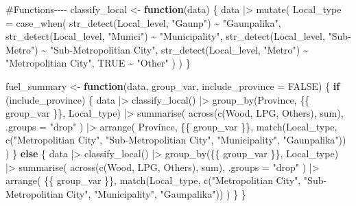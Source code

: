 \documentclass[
  letterpaper,
  DIV=11,
  numbers=noendperiod]{scrartcl}
\newenvironment{Shaded}{\begin{snugshade}}{\end{snugshade}}
\newcommand{\AttributeTok}[1]{\textcolor[rgb]{0.40,0.45,0.13}{#1}}
\newcommand{\CommentTok}[1]{\textcolor[rgb]{0.37,0.37,0.37}{#1}}
\newcommand{\ConstantTok}[1]{\textcolor[rgb]{0.56,0.35,0.01}{#1}}
\newcommand{\ControlFlowTok}[1]{\textcolor[rgb]{0.00,0.23,0.31}{\textbf{#1}}}
\newcommand{\FunctionTok}[1]{\textcolor[rgb]{0.28,0.35,0.67}{#1}}
\newcommand{\NormalTok}[1]{\textcolor[rgb]{0.00,0.23,0.31}{#1}}
\newcommand{\OtherTok}[1]{\textcolor[rgb]{0.00,0.23,0.31}{#1}}
\newcommand{\SpecialCharTok}[1]{\textcolor[rgb]{0.37,0.37,0.37}{#1}}
\newcommand{\StringTok}[1]{\textcolor[rgb]{0.13,0.47,0.30}{#1}}
\begin{document}
\begin{Shaded}
\begin{Highlighting}[]
\CommentTok{\#Functions{-}{-}{-}{-}}
\NormalTok{classify\_local }\OtherTok{\textless{}{-}} \ControlFlowTok{function}\NormalTok{(data) \{}
\NormalTok{  data }\SpecialCharTok{|\textgreater{}}
    \FunctionTok{mutate}\NormalTok{(}
      \AttributeTok{Local\_type =} \FunctionTok{case\_when}\NormalTok{(}
        \FunctionTok{str\_detect}\NormalTok{(Local\_level, }\StringTok{"Gaunp"}\NormalTok{) }\SpecialCharTok{\textasciitilde{}} \StringTok{"Gaunpalika"}\NormalTok{,}
        \FunctionTok{str\_detect}\NormalTok{(Local\_level, }\StringTok{"Munici"}\NormalTok{) }\SpecialCharTok{\textasciitilde{}} \StringTok{"Municipality"}\NormalTok{,}
        \FunctionTok{str\_detect}\NormalTok{(Local\_level, }\StringTok{"Sub{-}Metro"}\NormalTok{) }\SpecialCharTok{\textasciitilde{}} \StringTok{"Sub{-}Metropolitian City"}\NormalTok{,}
        \FunctionTok{str\_detect}\NormalTok{(Local\_level, }\StringTok{"Metro"}\NormalTok{) }\SpecialCharTok{\textasciitilde{}} \StringTok{"Metropolitian City"}\NormalTok{,}
        \ConstantTok{TRUE} \SpecialCharTok{\textasciitilde{}} \StringTok{"Other"}
\NormalTok{      )}
\NormalTok{    )}
\NormalTok{\}}

\NormalTok{fuel\_summary }\OtherTok{\textless{}{-}} \ControlFlowTok{function}\NormalTok{(data, group\_var, }\AttributeTok{include\_province =} \ConstantTok{FALSE}\NormalTok{) \{}
  \ControlFlowTok{if}\NormalTok{ (include\_province) \{}
\NormalTok{    data }\SpecialCharTok{|\textgreater{}}
      \FunctionTok{classify\_local}\NormalTok{() }\SpecialCharTok{|\textgreater{}}
      \FunctionTok{group\_by}\NormalTok{(Province, \{\{ group\_var \}\}, Local\_type) }\SpecialCharTok{|\textgreater{}}
      \FunctionTok{summarise}\NormalTok{(}
        \FunctionTok{across}\NormalTok{(}\FunctionTok{c}\NormalTok{(Wood, LPG, Others), sum),}
        \AttributeTok{.groups =} \StringTok{"drop"}
\NormalTok{      ) }\SpecialCharTok{|\textgreater{}}
      \FunctionTok{arrange}\NormalTok{(}
\NormalTok{        Province, \{\{ group\_var \}\},}
        \FunctionTok{match}\NormalTok{(Local\_type, }\FunctionTok{c}\NormalTok{(}\StringTok{"Metropolitian City"}\NormalTok{, }\StringTok{"Sub{-}Metropolitian City"}\NormalTok{, }\StringTok{"Municipality"}\NormalTok{, }\StringTok{"Gaunpalika"}\NormalTok{))}
\NormalTok{      )}
\NormalTok{  \} }\ControlFlowTok{else}\NormalTok{ \{}
\NormalTok{  data }\SpecialCharTok{|\textgreater{}}
    \FunctionTok{classify\_local}\NormalTok{() }\SpecialCharTok{|\textgreater{}}
    \FunctionTok{group\_by}\NormalTok{(\{\{ group\_var \}\}, Local\_type) }\SpecialCharTok{|\textgreater{}}
    \FunctionTok{summarise}\NormalTok{(}
      \FunctionTok{across}\NormalTok{(}\FunctionTok{c}\NormalTok{(Wood, LPG, Others), sum),}
      \AttributeTok{.groups =} \StringTok{"drop"}
\NormalTok{    ) }\SpecialCharTok{|\textgreater{}}
    \FunctionTok{arrange}\NormalTok{(}
\NormalTok{      \{\{ group\_var \}\},}
      \FunctionTok{match}\NormalTok{(Local\_type, }\FunctionTok{c}\NormalTok{(}\StringTok{"Metropolitian City"}\NormalTok{, }\StringTok{"Sub{-}Metropolitian City"}\NormalTok{, }\StringTok{"Municipality"}\NormalTok{, }\StringTok{"Gaunpalika"}\NormalTok{))}
\NormalTok{    )}
\NormalTok{  \}}
\NormalTok{\}}


\end{Highlighting}
\end{Shaded}
\end{document}

